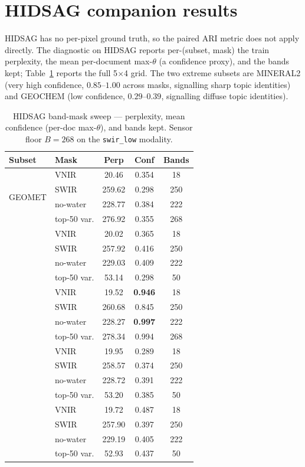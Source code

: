 \documentclass[11pt,a4paper]{article}
\begin{document}
\section{HIDSAG companion results}

HIDSAG has no per-pixel ground truth, so the paired ARI metric does
not apply directly. The diagnostic on HIDSAG reports per-(subset, mask)
the train perplexity, the mean per-document max-$\theta$ (a
confidence proxy), and the bands kept; Table~\ref{tab:hidsag-full}
reports the full 5$\times$4 grid. The two extreme subsets are MINERAL2
(very high confidence, $0.85$--$1.00$ across masks, signalling sharp
topic identities) and GEOCHEM (low confidence, $0.29$--$0.39$,
signalling diffuse topic identities).

\begin{table}[t]
\caption{HIDSAG band-mask sweep --- perplexity, mean confidence
(per-doc max-$\theta$), and bands kept. Sensor floor $B = 268$
on the \texttt{swir\_low} modality.}
\label{tab:hidsag-full}
\centering
\small
\begin{tabular}{ll c c c}
\toprule
Subset & Mask & Perp & Conf & Bands \\
\midrule
\multirow{4}{*}{GEOMET}
  & VNIR        & 20.46 & 0.354 & 18  \\
  & SWIR        & 259.62 & 0.298 & 250 \\
  & no-water    & 228.77 & 0.384 & 222 \\
  & top-50 var. & 276.92 & 0.355 & 268 \\
\addlinespace
\multirow{4}{*}{MINERAL1}
  & VNIR        & 20.02 & 0.365 & 18  \\
  & SWIR        & 257.92 & 0.416 & 250 \\
  & no-water    & 229.03 & 0.409 & 222 \\
  & top-50 var. & 53.14 & 0.298 & 50  \\
\addlinespace
\multirow{4}{*}{MINERAL2}
  & VNIR        & 19.52 & \textbf{0.946} & 18  \\
  & SWIR        & 260.68 & 0.845 & 250 \\
  & no-water    & 228.27 & \textbf{0.997} & 222 \\
  & top-50 var. & 278.34 & 0.994 & 268 \\
\addlinespace
\multirow{4}{*}{GEOCHEM}
  & VNIR        & 19.95 & 0.289 & 18  \\
  & SWIR        & 258.57 & 0.374 & 250 \\
  & no-water    & 228.72 & 0.391 & 222 \\
  & top-50 var. & 53.20 & 0.385 & 50  \\
\addlinespace
\multirow{4}{*}{PORPHYRY}
  & VNIR        & 19.72 & 0.487 & 18  \\
  & SWIR        & 257.90 & 0.397 & 250 \\
  & no-water    & 229.19 & 0.405 & 222 \\
  & top-50 var. & 52.93 & 0.437 & 50  \\
\bottomrule
\end{tabular}
\end{table}
\end{document}
